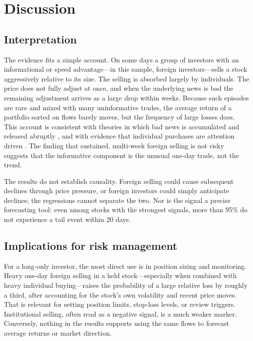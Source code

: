 \documentclass[11pt]{article}
\begin{document}
\section{Discussion}\label{sec:discussion}

\subsection{Interpretation}
The evidence fits a simple account. On some days a group of investors with an informational or speed advantage---in this
sample, foreign investors---sells a stock aggressively relative to its size. The selling is absorbed largely by
individuals. The price does not fully adjust at once, and when the underlying news is bad the remaining adjustment
arrives as a large drop within weeks. Because such episodes are rare and mixed with many uninformative trades, the
average return of a portfolio sorted on flows barely moves, but the frequency of large losses does. This account is
consistent with theories in which bad news is accumulated and released abruptly \citep{jin2006}, and with evidence that
individual purchases are attention driven \citep{barber2008}. The finding that sustained, multi-week foreign selling is
not risky suggests that the informative component is the unusual one-day trade, not the trend.

The results do not establish causality. Foreign selling could cause subsequent declines through price pressure, or
foreign investors could simply anticipate declines; the regressions cannot separate the two. Nor is the signal a
precise forecasting tool: even among stocks with the strongest signals, more than 95\% do not experience a tail event
within 20 days.

\subsection{Implications for risk management}
For a long-only investor, the most direct use is in position sizing and monitoring. Heavy one-day foreign selling in a
held stock---especially when combined with heavy individual buying---raises the probability of a large relative loss
by roughly a third, after accounting for the stock's own volatility and recent price moves. That is relevant for
setting position limits, stop-loss levels, or review triggers. Institutional selling, often read as a negative signal,
is a much weaker marker. Conversely, nothing in the results supports using the same flows to forecast average returns
or market direction.
\end{document}
